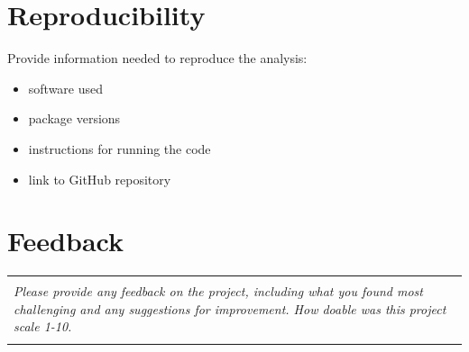 \documentclass[11pt]{article}
\begin{document}
\section{Reproducibility}

Provide information needed to reproduce the analysis:
\begin{itemize}
\item software used
\item package versions
\item instructions for running the code
\item link to GitHub repository
\end{itemize}

\section{Feedback}
\begin{center}
\begin{tabular}{|p{}|}
\hline 
\\
\textit{Please provide any feedback on the project, including what you found most challenging and any suggestions for improvement. How doable was this project scale 1-10.} \\ 
\\
\hline
\end{tabular}
\end{center}
\end{document}

